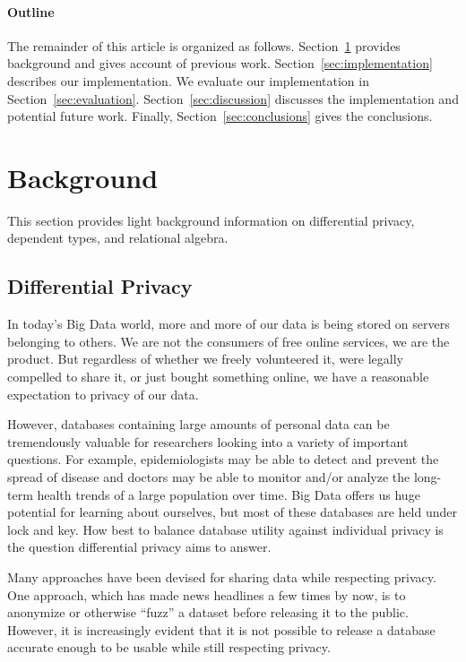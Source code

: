 \documentclass[12pt]{article}
\begin{document}
\paragraph{Outline}
The remainder of this article is organized as follows.
Section~\ref{sec:background} provides background and gives account of previous work.
Section~\ref{sec:implementation} describes our implementation.
We evaluate our implementation in Section~\ref{sec:evaluation}.
Section~\ref{sec:discussion} discusses the implementation and potential future work.
Finally, Section~\ref{sec:conclusions} gives the conclusions.

\section{Background}\label{sec:background}

This section provides light background information on differential privacy, dependent types, and relational algebra.

\subsection{Differential Privacy}\label{sec:differential_privacy}

In today's Big Data world, more and more of our data is being stored on servers belonging to others.
We are not the consumers of free online services, we are the product.
But regardless of whether we freely volunteered it, were legally compelled to share it, or just bought something online, we have a reasonable expectation to privacy of our data.

However, databases containing large amounts of personal data can be tremendously valuable for researchers looking into a variety of important questions.
For example, epidemiologists may be able to detect and prevent the spread of disease and doctors may be able to monitor and/or analyze the long-term health trends of a large population over time.
Big Data offers us huge potential for learning about ourselves, but most of these databases are held under lock and key.
How best to balance database utility against individual privacy is the question differential privacy aims to answer.

Many approaches have been devised for sharing data while respecting privacy.
One approach, which has made news headlines a few times by now, is to anonymize or otherwise ``fuzz'' a dataset before releasing it to the public.
However, it is increasingly evident that it is not possible to release a database accurate enough to be usable while still respecting privacy\cite{journals/cacm/Dwork11}.
\end{document}
